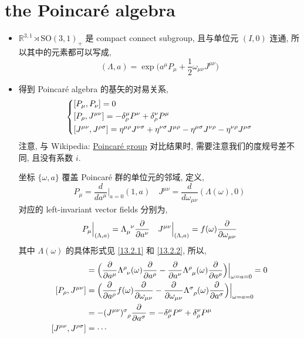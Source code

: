 \section{the Poincaré algebra}
\begin{itemize}
	\item $\mathbb{R}^{3, 1} \rtimes \mathrm{SO}(3, 1)_+$ 是 compact connect subgroup, 且与单位元 $(I, 0)$ 连通, 所以其中的元素都可以写成,
	\begin{equation}
		(\Lambda, a) = \exp \Big( a^\mu P_\mu + \frac{1}{2} \omega_{\mu \nu} J^{\mu \nu} \Big)
	\end{equation}
	
	\item 得到 Poincaré algebra 的基矢的对易关系,
	\begin{equation}
		\begin{dcases}
			[P_\mu, P_\nu] = 0 \\
			[P_\rho, J^{\mu \nu}] = - \delta^\mu_\rho P^\nu + \delta^\nu_\rho P^\mu \\
			[J^{\mu \nu}, J^{\rho \sigma}] = \eta^{\mu \rho} J^{\nu \sigma} + \eta^{\nu \sigma} J^{\mu \rho} - \eta^{\mu \sigma} J^{\nu \rho} - \eta^{\nu \rho} J^{\mu \sigma}
		\end{dcases}
	\end{equation}
	注意, 与 Wikipedia: \href{https://en.wikipedia.org/wiki/Poincar%C3%A9_group}{Poincaré group} 对比结果时, 需要注意我们的度规号差不同, 且没有系数 $i$.
	
	\begin{tcolorbox}[title=proof:]
		坐标 $\{\omega, a\}$ 覆盖 Poincaré 群的单位元的邻域, 定义,
		\begin{equation}
			P_\mu = \frac{d}{da^\mu} \Big|_{a = 0} (1, a) \quad J^{\mu \nu} = \frac{d}{d\omega_{\mu \nu}} (\Lambda(\omega), 0)
		\end{equation}
		对应的 left-invariant vector fields 分别为,
		\begin{equation}
			P_\mu \Big|_{(\Lambda, a)} = \tensor{\Lambda}{_\mu^\nu} \frac{\partial}{\partial a^\nu} \quad J^{\mu \nu} \Big|_{(\Lambda, a)} = f(\omega) \frac{\partial}{\partial\omega_{\mu \nu}}
		\end{equation}
		其中 $\Lambda(\omega)$ 的具体形式见 \eqref{13.2.1} 和 \eqref{13.2.2}, 所以,
		\begin{align}
			[P_\mu, P_\nu] &= \Big( \frac{\partial}{\partial a^\mu} \tensor{\Lambda}{^\rho_\nu}(\omega) \frac{\partial}{\partial a^\rho} - \frac{\partial}{\partial a^\nu} \tensor{\Lambda}{^\rho_\mu}(\omega) \frac{\partial}{\partial a^\rho} \Big) \Big|_{\omega = a = 0} = 0 \\
			[P_\rho, J^{\mu \nu}] &= \Big( \frac{\partial}{\partial a^\rho} f(\omega) \frac{\partial}{\partial\omega_{\mu \nu}} - \frac{\partial}{\partial\omega_{\mu \nu}} \tensor{\Lambda}{^\sigma_\rho}(\omega) \frac{\partial}{\partial a^\sigma} \Big) \Big|_{\omega = a = 0} \notag \\
			&= - \tensor{(J^{\mu \nu})}{^\sigma_\rho} \frac{\partial}{\partial a^\sigma} = - \delta^\mu_\rho P^\nu + \delta^\nu_\rho P^\mu \\
			[J^{\mu \nu}, J^{\rho \sigma}] &= \cdots
		\end{align}
		

\end{tcolorbox}
\end{itemize}
